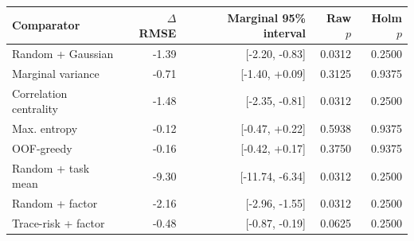 \begin{tabular}{lrrrr}
\toprule
Comparator & $\Delta$ RMSE & Marginal 95\% interval & Raw $p$ & Holm $p$ \\
\midrule
Random + Gaussian & -1.39 & [-2.20, -0.83] & 0.0312 & 0.2500 \\
Marginal variance & -0.71 & [-1.40, +0.09] & 0.3125 & 0.9375 \\
Correlation centrality & -1.48 & [-2.35, -0.81] & 0.0312 & 0.2500 \\
Max. entropy & -0.12 & [-0.47, +0.22] & 0.5938 & 0.9375 \\
OOF-greedy & -0.16 & [-0.42, +0.17] & 0.3750 & 0.9375 \\
Random + task mean & -9.30 & [-11.74, -6.34] & 0.0312 & 0.2500 \\
Random + factor & -2.16 & [-2.96, -1.55] & 0.0312 & 0.2500 \\
Trace-risk + factor & -0.48 & [-0.87, -0.19] & 0.0625 & 0.2500 \\
\bottomrule
\end{tabular}
